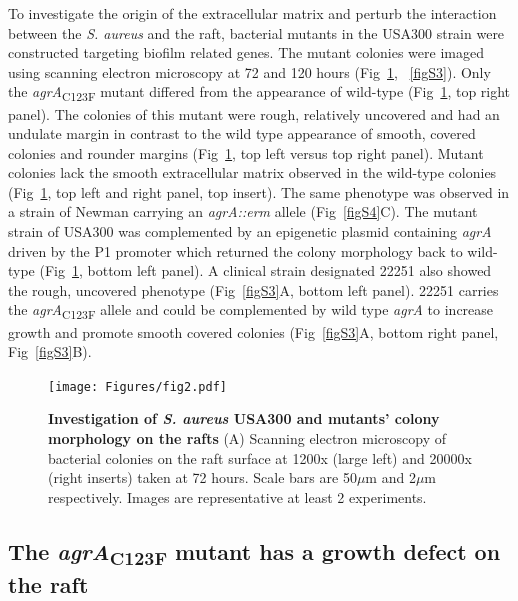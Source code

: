 \documentclass[10pt,letterpaper]{article}
\begin{document}
To investigate the origin of the extracellular matrix and perturb the interaction between the \textit{S. aureus} and the raft, bacterial mutants in the USA300 strain were constructed targeting biofilm related genes.
The mutant colonies were imaged using scanning electron microscopy at 72 and 120 hours (Fig~\ref{fig2}, ~\ref{figS3}).
Only the \textit{agrA}\textsubscript{C123F} mutant differed from the appearance of wild-type (Fig~\ref{fig2}, top right panel).
The colonies of this mutant were rough, relatively uncovered and had an undulate margin in contrast to the wild type appearance of smooth, covered colonies and rounder margins (Fig~\ref{fig2}, top left versus top right panel).
Mutant colonies lack the smooth extracellular matrix observed in the wild-type colonies (Fig~\ref{fig2}, top left and right panel, top insert).
The same phenotype was observed in a strain of Newman carrying an \textit{agrA::erm} allele (Fig~\ref{figS4}C).
The mutant strain of USA300 was complemented by an epigenetic plasmid containing \textit{agrA} driven by the P1 promoter which returned the colony morphology back to wild-type (Fig~\ref{fig2}, bottom left panel).
A clinical strain designated 22251 also showed the rough, uncovered phenotype (Fig~\ref{figS3}A, bottom left panel).
22251 carries the \textit{agrA}\textsubscript{C123F} allele and could be complemented by wild type \textit{agrA} to increase growth and promote smooth covered colonies (Fig~\ref{figS3}A, bottom right panel, Fig~\ref{figS3}B).


\begin{figure}[!ht]
\begin{adjustwidth}{-2.25in}{0in}
\texttt{[image: Figures/fig2.pdf]}
\caption[Investigation of \textit{S. aureus} USA300 and mutants' colony morphology on the rafts]{
	\textbf{Investigation of \textit{S. aureus} USA300 and mutants' colony morphology on the rafts}
	(A) Scanning electron microscopy of bacterial colonies on the raft surface at 1200x (large left) and 20000x (right inserts) taken at 72 hours. Scale bars are 50$\mu$m and 2$\mu$m respectively. Images are representative at least 2 experiments.}
    \label{fig2}
    \end{adjustwidth}
\end{figure}

\subsection*{The \textit{agrA}\textsubscript{C123F} mutant has a growth defect on the raft}
\end{document}
